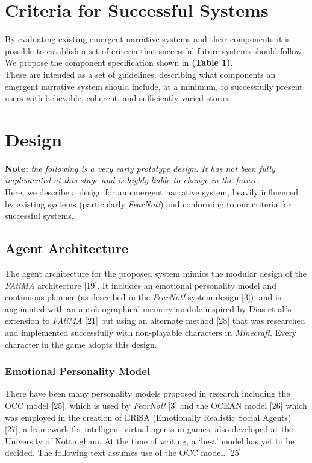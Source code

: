 \documentclass{sig-alternate-05-2015}
\begin{document}
\section{Criteria for Successful Systems}
\noindent By evaluating existing emergent narrative systems and their components it is possible to establish a set of criteria that successful future systems should follow. We propose the component specification shown in \textbf{(Table 1)}.\\

These are intended as a set of guidelines, describing what components an emergent narrative system should include, at a minimum, to successfully present users with believable, coherent, and sufficiently varied stories.


\newpage
\section{Design}
\noindent \textbf{Note:} \textit{the following is a very early prototype design. It has not been fully implemented at this stage and is highly liable to change in the future.}\\

\noindent Here, we describe a design for an emergent narrative system, heavily influenced by existing systems (particularly \textit{FearNot!}) and conforming to our criteria for successful systems. 

\subsection{Agent Architecture}
\noindent The agent architecture for the proposed system mimics the modular design of the \textit{FAtiMA} architecture [19]. It includes an emotional personality model and continuous planner (as described in the \textit{FearNot!} system design [3]), and is augmented with an autobiographical memory module inspired by Dias et al.'s extension to \textit{FAtiMA} [21] but using an alternate method [28] that was researched and implemented successfully with non-playable characters in \textit{Minecraft}. Every character in the game adopts this design.

\subsubsection{Emotional Personality Model} There have been many personality models proposed in research including the OCC model [25], which is used by \textit{FearNot!} [3] and the OCEAN model [26] which was employed in the creation of ERiSA (Emotionally Realistic Social Agents) [27], a framework for intelligent virtual agents in games, also developed at the University of Nottingham. At the time of writing, a `best' model has yet to be decided. The following text assumes use of the OCC model. [25]\\
\end{document}
